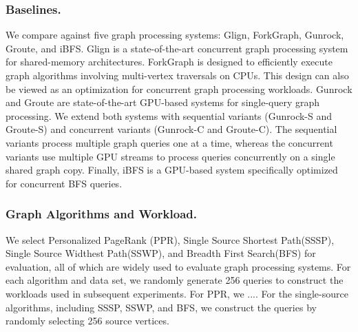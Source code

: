\subsubsection{Baselines.} We compare \system against five graph processing systems: Glign, ForkGraph, Gunrock, Groute, and iBFS. Glign is a state-of-the-art concurrent graph processing system for shared-memory architectures. ForkGraph is designed to efficiently execute graph algorithms involving multi-vertex traversals on CPUs. This design can also be viewed as an optimization for concurrent graph processing workloads. Gunrock and Groute are state-of-the-art GPU-based systems for single-query graph processing. We extend both systems with sequential variants (Gunrock-S and Groute-S) and concurrent variants (Gunrock-C and Groute-C). The sequential variants process multiple graph queries one at a time, whereas the concurrent variants use multiple GPU streams to process queries concurrently on a single shared graph copy. Finally, iBFS is a GPU-based system specifically optimized for concurrent BFS queries.

\subsubsection{Graph Algorithms and Workload.}
We select Personalized PageRank (PPR), Single Source Shortest Path(SSSP), Single Source Widthest Path(SSWP), and Breadth First Search(BFS) for evaluation, all of which are widely used to evaluate graph processing systems. For each algorithm and data set, we randomly generate 256 queries to construct the workloads used in subsequent experiments. For PPR, we .... For the single-source algorithms, including SSSP, SSWP, and BFS, we construct the queries by randomly selecting 256 source vertices.

